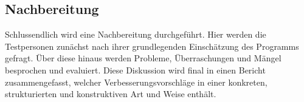 \subsection{Nachbereitung}

Schlussendlich wird eine Nachbereitung durchgeführt.
Hier werden die Testpersonen zunächst nach ihrer grundlegenden Einschätzung des Programms gefragt.
Über diese hinaus werden Probleme, Überraschungen und Mängel besprochen und evaluiert.
Diese Diskussion wird final in einen Bericht zusammengefasst, welcher Verbesserungsvorschläge in einer konkreten, strukturierten und konstruktiven Art und Weise enthält.